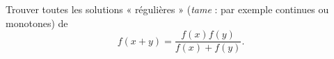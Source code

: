 Trouver toutes les solutions « régulières » (\emph{tame} : par exemple continues ou monotones) de
\[ f(x + y) = \frac{f(x)f(y)}{f(x) + f(y)}. \]
